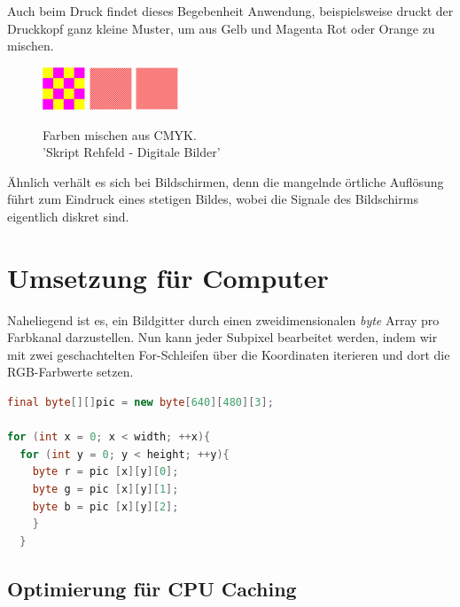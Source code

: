 \documentclass[tog]{acmsiggraph}
\begin{document}
Auch beim Druck findet dieses Begebenheit Anwendung, beispielsweise druckt der Druckkopf ganz kleine Muster, um aus Gelb und Magenta Rot oder Orange zu mischen.

\begin{figure}[ht]
  \centering
  \includegraphics[width=0.5in]{images/gelbMagentaMusterGrob}
  \includegraphics[width=0.5in]{images/gelbMagentaMusterFeiner}
  \includegraphics[width=0.5in]{images/gelbMagentaMusterFein}
  \caption{Farben mischen aus CMYK. \\'Skript Rehfeld - Digitale Bilder'}
  \label{fig:Aus Grundfarben wird neue eine Farbe}
\end{figure}

Ähnlich verhält es sich bei Bildschirmen, denn die mangelnde örtliche Auflösung führt zum Eindruck eines stetigen Bildes, wobei die Signale des Bildschirms eigentlich diskret sind.

\section{Umsetzung für Computer}
Naheliegend ist es, ein Bildgitter durch einen zweidimensionalen \textit{byte} Array pro Farbkanal darzustellen.
Nun kann jeder Subpixel bearbeitet werden, indem wir mit zwei geschachtelten For-Schleifen über die Koordinaten iterieren und dort die RGB-Farbwerte setzen.
\begin{lstlisting}[language=Java]
final byte[][]pic = new byte[640][480][3];

for (int x = 0; x < width; ++x){
  for (int y = 0; y < height; ++y){
    byte r = pic [x][y][0];
    byte g = pic [x][y][1];
    byte b = pic [x][y][2];
    }
  }
\end{lstlisting}

\subsection{Optimierung für CPU Caching}
\end{document}

